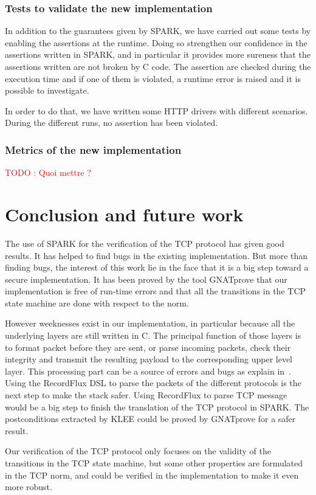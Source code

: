 \documentclass[runningheads]{llncs}
\begin{document}
\subsubsection{Tests to validate the new implementation}

    In addition to the guarantees given by SPARK, we have carried out some tests by enabling the assertions at the runtime.
    Doing so strengthen our confidence in the assertions written in SPARK, and in particular it provides more sureness
    that the assertions written are not broken by C code. The assertion are checked during the execution time
    and if one of them is violated, a runtime error is raised and it is possible to investigate.

    In order to do that, we have written some HTTP drivers with different scenarios. During the different runs,
    no assertion has been violated.

\subsubsection{Metrics of the new implementation}

    \textcolor{red}{TODO : Quoi mettre ?}


\section{Conclusion and future work}

    The use of SPARK for the verification of the TCP protocol has given good results. It has helped to find bugs
    in the existing implementation. But more than finding bugs, the interest of this work lie in the face that it is
    a big step toward a secure implementation. It has been proved by the tool GNATprove that our implementation is free
    of run-time errors and that all the transitions in the TCP state machine are done with respect to the norm.

    However weeknesses exist in our implementation, in particular because all the underlying layers are still written in C.
    The principal function of those layers is to format packet before they are sent, or parse incoming packets, check
    their integrity and transmit the resulting payload to the corresponding upper level layer.
    This processing part can be a source of errors and bugs as explain in~\cite{Reiher2019RecordFluxFM}.
    Using the RecordFlux DSL to parse the packets of the different protocols is the next step to make the stack safer.
    Using RecordFlux to parse TCP message would be a big step to finish the translation of the TCP protocol in SPARK.
    The postconditions extracted by KLEE could be proved by GNATprove for a safer result.

    Our verification of the TCP protocol only focuses on the validity of the transitions in the TCP state machine,
    but some other properties are formulated in the TCP norm, and could be verified in the implementation to make
    it even more robust.






\end{document}
